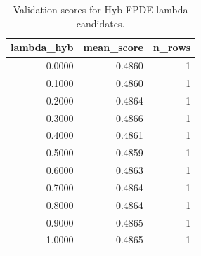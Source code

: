 \begin{table}[t]
\caption{Validation scores for Hyb-FPDE lambda candidates.}
\label{tab:lambda_distribution_computed}
\centering
\begin{tabular}{rrr}
\toprule
lambda\_hyb & mean\_score & n\_rows \\
\midrule
0.0000 & 0.4860 & 1 \\
0.1000 & 0.4860 & 1 \\
0.2000 & 0.4864 & 1 \\
0.3000 & 0.4866 & 1 \\
0.4000 & 0.4861 & 1 \\
0.5000 & 0.4859 & 1 \\
0.6000 & 0.4863 & 1 \\
0.7000 & 0.4864 & 1 \\
0.8000 & 0.4864 & 1 \\
0.9000 & 0.4865 & 1 \\
1.0000 & 0.4865 & 1 \\
\bottomrule
\end{tabular}

\end{table}
